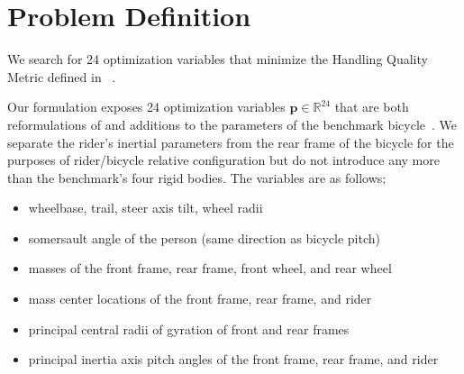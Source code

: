 \documentclass{bmd2019a}
\begin{document}
\section*{Problem Definition}

We search for 24 optimization variables that minimize the Handling Quality
Metric defined in ~\cite{Hess2012}.

Our formulation exposes 24 optimization variables
$\mathbf{p}\in\mathbb{R}^{24}$ that are both reformulations of and additions to
the parameters of the benchmark bicycle~\cite{Meijaard2007}. We separate the
rider's inertial parameters from the rear frame of the bicycle for the purposes
of rider/bicycle relative configuration but do not introduce any more than the
benchmark's four rigid bodies. The variables are as follows;
%
\begin{itemize}
  \itemsep-0.25em
  \item wheelbase, trail, steer axis tilt, wheel radii
  \item somersault angle of the person (same direction as bicycle pitch)
  \item masses of the front frame, rear frame, front wheel, and rear wheel
  \item mass center locations of the front frame, rear frame, and rider
  \item principal central radii of gyration of front and rear frames
  \item principal inertia axis pitch angles of the front frame, rear frame, and rider
\end{itemize}
\end{document}
